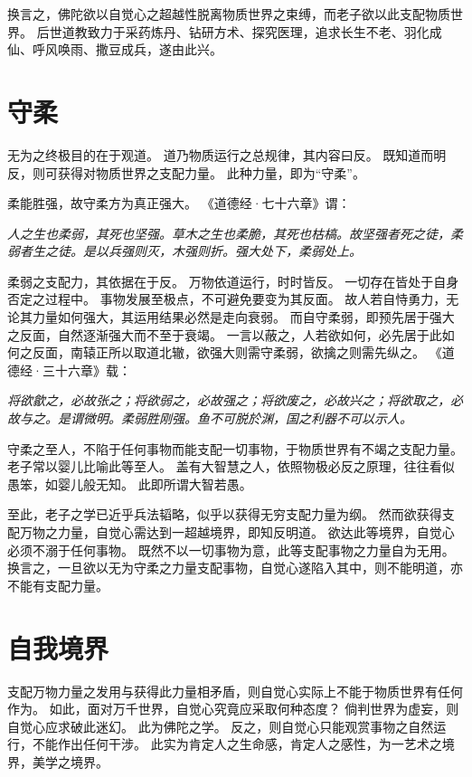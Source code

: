 \documentclass[11pt]{article}
\begin{document}
换言之，佛陀欲以自觉心之超越性脱离物质世界之束缚，而老子欲以此支配物质世界。
后世道教致力于采药炼丹、钻研方术、探究医理，追求长生不老、羽化成仙、呼风唤雨、撒豆成兵，遂由此兴。
  
\section{守柔}
无为之终极目的在于观道。
道乃物质运行之总规律，其内容曰反。
既知道而明反，则可获得对物质世界之支配力量。
此种力量，即为“守柔”。

\newline

柔能胜强，故守柔方为真正强大。
《道德经·七十六章》谓：

\textit{人之生也柔弱，其死也坚强。草木之生也柔脆，其死也枯槁。故坚强者死之徒，柔弱者生之徒。是以兵强则灭，木强则折。强大处下，柔弱处上。}

\newline

柔弱之支配力，其依据在于反。
万物依道运行，时时皆反。
一切存在皆处于自身否定之过程中。
事物发展至极点，不可避免要变为其反面。
故人若自恃勇力，无论其力量如何强大，其运用结果必然是走向衰弱。
而自守柔弱，即预先居于强大之反面，自然逐渐强大而不至于衰竭。
一言以蔽之，人若欲如何，必先居于此如何之反面，南辕正所以取道北辙，欲强大则需守柔弱，欲擒之则需先纵之。
《道德经·三十六章》载：

\textit{将欲歙之，必故张之；将欲弱之，必故强之；将欲废之，必故兴之；将欲取之，必故与之。是谓微明。柔弱胜刚强。鱼不可脱於渊，国之利器不可以示人。}
  
\newline

守柔之至人，不陷于任何事物而能支配一切事物，于物质世界有不竭之支配力量。
老子常以婴儿比喻此等至人。
盖有大智慧之人，依照物极必反之原理，往往看似愚笨，如婴儿般无知。
此即所谓大智若愚。

\newline

至此，老子之学已近乎兵法韬略，似乎以获得无穷支配力量为纲。
然而欲获得支配万物之力量，自觉心需达到一超越境界，即知反明道。
欲达此等境界，自觉心必须不溺于任何事物。
既然不以一切事物为意，此等支配事物之力量自为无用。
换言之，一旦欲以无为守柔之力量支配事物，自觉心遂陷入其中，则不能明道，亦不能有支配力量。

\section{自我境界}
支配万物力量之发用与获得此力量相矛盾，则自觉心实际上不能于物质世界有任何作为。
如此，面对万千世界，自觉心究竟应采取何种态度？
倘判世界为虚妄，则自觉心应求破此迷幻。
此为佛陀之学。
反之，则自觉心只能观赏事物之自然运行，不能作出任何干涉。
此实为肯定人之生命感，肯定人之感性，为一艺术之境界，美学之境界。
\end{document}
